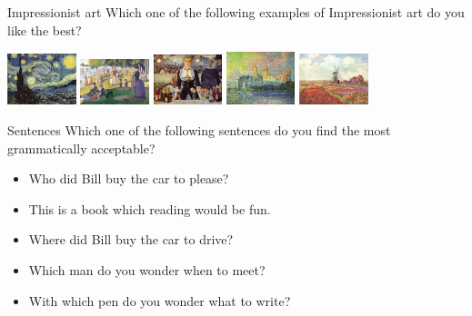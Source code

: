 \documentclass{beamer}
\begin{document}
\begin{frame}{Impressionist art}
Which one of the following examples of Impressionist art do you like the best?

\vspace{0.5cm}
\includegraphics[width=2cm]{Impressionist_art1.jpg}
\includegraphics[width=2cm]{Impressionist_art2.jpg}
\includegraphics[width=2cm]{Impressionist_art3.jpg}
\includegraphics[width=2cm]{Impressionist_art4.jpg}
\includegraphics[width=2cm]{Impressionist_art5.jpg}
\end{frame}

\begin{frame}{Sentences}
Which one of the following sentences do you find the most grammatically acceptable?

\begin{itemize}
	\item Who did Bill buy the car to please?
	\item This is a book which reading would be fun.
	\item Where did Bill buy the car to drive?
	\item Which man do you wonder when to meet?
	\item With which pen do you wonder what to write?
\end{itemize}
\end{frame}
\end{document}
